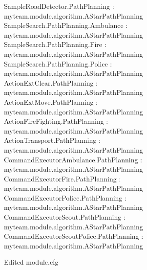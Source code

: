 \documentclass[a4paper]{article}
\begin{document}
\begin{figure}[h]
 \begin{center}
\begin{screen}
{\ttfamily
SampleRoadDetector.PathPlanning : myteam.module.algorithm.AStarPathPlanning\\
SampleSearch.PathPlanning.Ambulance : myteam.module.algorithm.AStarPathPlanning\\
SampleSearch.PathPlanning.Fire : myteam.module.algorithm.AStarPathPlanning\\
SampleSearch.PathPlanning.Police : myteam.module.algorithm.AStarPathPlanning\\
ActionExtClear.PathPlanning : myteam.module.algorithm.AStarPathPlanning\\
ActionExtMove.PathPlanning : myteam.module.algorithm.AStarPathPlanning\\
ActionFireFighting.PathPlanning : myteam.module.algorithm.AStarPathPlanning\\
ActionTransport.PathPlanning : myteam.module.algorithm.AStarPathPlanning\\
CommandExecutorAmbulance.PathPlanning : myteam.module.algorithm.AStarPathPlanning\\
CommandExecutorFire.PathPlanning : myteam.module.algorithm.AStarPathPlanning\\
CommandExecutorPolice.PathPlanning : myteam.module.algorithm.AStarPathPlanning\\
CommandExecutorScout.PathPlanning : myteam.module.algorithm.AStarPathPlanning\\
CommandExecutorScoutPolice.PathPlanning : myteam.module.algorithm.AStarPathPlanning
}
\end{screen}
  \caption{Edited module.cfg}
  \label{fig:edited_module.cfg}
 \end{center}
\end{figure}
\end{document}
